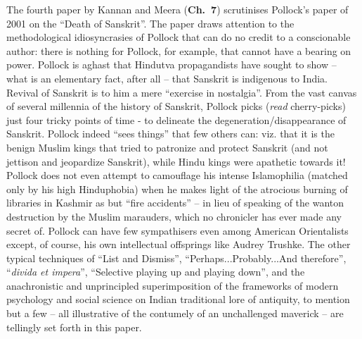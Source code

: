 The fourth paper by Kannan and Meera ({\bf Ch.~7}) scrutinises Pollock’s paper of 2001 on the “Death of Sanskrit”. The paper draws attention to the methodological idiosyncrasies of Pollock that can do no credit to a conscionable author: there is nothing for Pollock, for example, that cannot have a bearing on power. Pollock is aghast that Hindutva propagandists have sought to show – what is an elementary fact, after all – that Sanskrit is indigenous to India.  Revival of Sanskrit is to him a mere “exercise in nostalgia”. From the vast canvas of several millennia of the history of Sanskrit, Pollock picks ({\sl read} cherry-picks) just four tricky points of time - to delineate the degeneration/disappearance of Sanskrit. Pollock indeed “sees things” that few others can: viz. that it is the benign Muslim kings that tried to patronize and protect Sanskrit (and not jettison and jeopardize Sanskrit), while Hindu kings were apathetic towards it! Pollock does not even attempt to camouflage his intense Islamophilia (matched only by his high Hinduphobia) when he makes light of the atrocious burning of libraries in Kashmir as but “fire accidents” – in lieu of speaking of the wanton destruction by the Muslim marauders, which no chronicler has ever made any secret of. Pollock can have few sympathisers even among American Orientalists except, of course, his own intellectual offsprings like Audrey Trushke. The other typical techniques of “List and Dismiss”, “Perhaps...Probably...And therefore”, “{\sl divida et impera}”, “Selective playing up and playing down”, and the anachronistic and unprincipled superimposition of the frameworks of modern psychology and social science on Indian traditional lore of antiquity, to mention but a few – all illustrative of the contumely of an unchallenged maverick – are tellingly set forth in this paper.

